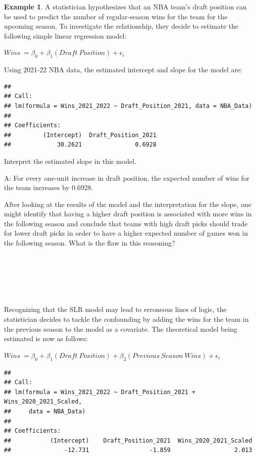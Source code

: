 \documentclass[
  11pt,
]{book}
\theoremstyle{definition}
\theoremstyle{definition}
\newtheorem{example}{Example}[chapter]
\theoremstyle{definition}
\theoremstyle{definition}
\theoremstyle{remark}
\begin{document}
\begin{example}
A statistician hypothesizes that an NBA team's draft position can be used to predict the number of regular-season wins for the team for the upcoming season. To investigate the relationship, they decide to estimate the following simple linear regression model:

\(Wins\ = \beta_0 + \beta_1(Draft\ Position) + \epsilon_i\)

Using 2021-22 NBA data, the estimated intercept and slope for the model are:

\begin{verbatim}
## 
## Call:
## lm(formula = Wins_2021_2022 ~ Draft_Position_2021, data = NBA_Data)
## 
## Coefficients:
##         (Intercept)  Draft_Position_2021  
##             30.2621               0.6928
\end{verbatim}

Interpret the estimated slope in this model.
\end{example}

A: For every one-unit increase in draft position, the expected number of wins for the team increases by 0.6928.

After looking at the results of the model and the interpretation for the slope, one might identify that having a higher draft position is associated with more wins in the following season and conclude that teams with high draft picks should trade for lower draft picks in order to have a higher expected number of games won in the following season. What is the flaw in this reasoning?

\(~\)

\(~\)

\(~\)

Recognizing that the SLR model may lead to erroneous lines of logic, the statistician decides to tackle the confounding by adding the wins for the team in the previous season to the model as a covariate. The theoretical model being estimated is now as follows:

\(Wins\ = \beta_0 + \beta_1(Draft\ Position) + \beta_2(Previous\ Season\ Wins) + \epsilon_i\)

\begin{verbatim}
## 
## Call:
## lm(formula = Wins_2021_2022 ~ Draft_Position_2021 + Wins_2020_2021_Scaled, 
##     data = NBA_Data)
## 
## Coefficients:
##           (Intercept)    Draft_Position_2021  Wins_2020_2021_Scaled  
##               -12.731                 -1.859                  2.013
\end{verbatim}
\end{document}
